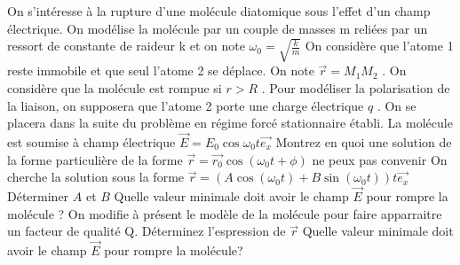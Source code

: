 \begin{Exercise}[title=Dissociation moléculaire]
  On s'intéresse à la rupture d'une molécule diatomique sous l'effet d'un champ
  électrique. On modélise la molécule par un couple de masses m reliées par un
  ressort de constante de raideur k et on note
  $\omega_0=\sqrt{\frac{k}{m}}$
  On considère que l'atome 1 reste immobile et que seul l'atome 2 se déplace. On
  note $\vec{r}=M_1M_2$ . On considère que la molécule est rompue si $r > R$ . Pour
  modéliser la polarisation de la liaison, on supposera que l'atome 2 porte une
  charge électrique $q$ . On se placera dans la suite du problème en régime
  forcé stationnaire établi.
  \Question La molécule est soumise à champ électrique
  $\vec{E}=E_0\cos{\omega_0t}\vec{e_x}$
  \subQuestion Montrez en quoi une solution de la forme particulière de la forme
  $\vec{r}=\vec{r_0}\cos({\omega_0t+\phi})$ ne peux pas convenir
  \subQuestion On cherche la solution sous la forme
  $\vec{r}=(A\cos(\omega_0t)+B\sin(\omega_0t))t \vec{e_x}$ Déterminer $A$ et $B$
  \subQuestion Quelle valeur minimale doit avoir le champ $\vec{E}$ pour rompre
  la molécule ?
  \Question On modifie à présent le modèle de la molécule pour faire apparraitre
  un facteur de qualité Q.
  \subQuestion Déterminez l'espression de $\vec{r}$
  \subQuestion Quelle valeur minimale doit avoir le champ $\vec{E}$ pour rompre
  la molécule?
\end{Exercise}
